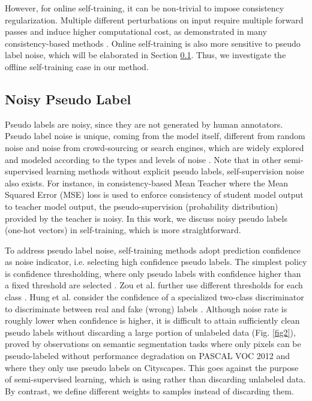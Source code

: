 \documentclass[preprint,review,10pt]{elsarticle}
\begin{document}
However, for online self-training, it can be non-trivial to impose consistency regularization. Multiple different perturbations on input require multiple forward passes and induce higher computational cost, as demonstrated in many consistency-based methods \cite{laine2017temporal,tarvainen2017mean}. Online self-training is also more sensitive to pseudo label noise, which will be elaborated in Section \ref{sec:3}. Thus, we investigate the offline self-training case in our method. 

\subsection{Noisy Pseudo Label}
\label{sec:3}

Pseudo labels are noisy, since they are not generated by human annotators. Pseudo label noise is unique, coming from the model itself, different from random noise and noise from crowd-sourcing or search engines, which are widely explored and modeled according to the types and levels of noise \cite{angluin1988learning,goldberger2017training,malach2017decoupling}. Note that in other semi-supervised learning methods without explicit pseudo labels, self-supervision noise also exists. For instance, in consistency-based Mean Teacher \cite{tarvainen2017mean} where the Mean Squared Error (MSE) loss is used to enforce consistency of student model output to teacher model output, the pseudo-supervision (probability distribution) provided by the teacher is noisy. In this work, we discuss noisy pseudo labels (one-hot vectors) in self-training, which is more straightforward.

To address pseudo label noise, self-training methods adopt prediction confidence as noise indicator, i.e. selecting high confidence pseudo labels. The simplest policy is confidence thresholding, where only pseudo labels with confidence higher than a fixed threshold are selected \cite{lee2013pseudo}. Zou et al. further use different thresholds for each class \cite{cbst}. Hung et al. consider the confidence of a specialized two-class discriminator to discriminate between real and fake (wrong) labels \cite{hung}. Although noise rate is roughly lower when confidence is higher, it is difficult to attain sufficiently clean pseudo labels without discarding a large portion of unlabeled data (Fig. \ref{fig2}), proved by observations on semantic segmentation tasks \cite{hung} where only  pixels can be pseudo-labeled without performance degradation on PASCAL VOC 2012 and \cite{crst} where they only use  pseudo labels on Cityscapes. This goes against the purpose of semi-supervised learning, which is using rather than discarding unlabeled data. By contrast, we define different weights to samples instead of discarding them.
\end{document}
